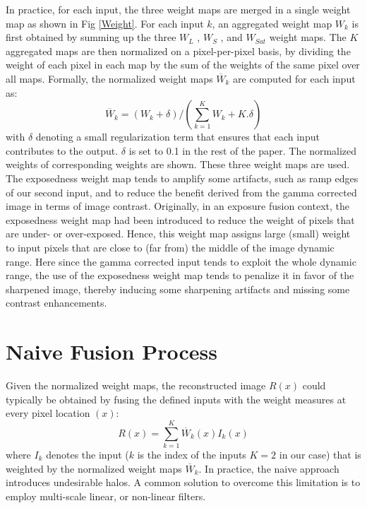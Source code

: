 \documentclass[hidelinks, 12pt]{report}
\begin{document}
In practice, for each input, the three weight maps are merged in a single weight map as shown in Fig \ref{Weight}. For each input $k$, an aggregated weight map $W_k$ is first obtained by summing up the three $W_L$ , $W_S$ , and $W_{Sat}$ weight maps. The $K$ aggregated maps are then normalized on a pixel-per-pixel basis, by dividing the weight of each pixel in each map by the sum of the weights of the same pixel over all maps. Formally, the
normalized weight maps $\overline{W}_k$ are computed for each input as:
\begin{equation}
\overline{W}_{k}=(W_k+\delta)/(\sum_{k=1}^{K}W_k + K.\delta)
\end{equation}
with $\delta$ denoting a small regularization term that ensures that each input contributes to the output. $\delta$ is set to 0.1 in the rest of the paper. The normalized weights of corresponding weights are shown. These three weight maps are used. The exposedness weight map tends to amplify some artifacts, such as ramp edges of our second input, and to reduce the benefit derived from the gamma corrected image in terms of image contrast. Originally, in an exposure fusion context, the exposedness weight map had been introduced to reduce the weight of pixels that are under- or over-exposed. Hence, this weight map assigns large (small) weight to input pixels that are close to (far from) the middle of the image dynamic range. Here since the gamma corrected input tends to exploit the whole dynamic range, the use of the exposedness weight map tends to penalize it in favor of the sharpened image, thereby inducing some sharpening artifacts and missing some contrast enhancements.

\section{Naive Fusion Process}
Given the normalized weight maps, the reconstructed image $R(x)$ could typically be obtained by fusing the defined inputs with the weight measures at every pixel location $(x)$:
\begin{equation}
R(x)=\sum_{k=1}^{K}\overline{W}_k(x)I_k(x)
\end{equation}
where $I_k$ denotes the input ($k$ is the index of the inputs $K=2$ in our case) that is weighted by the normalized weight maps $\overline{W}_k$. In practice, the naive approach introduces undesirable halos. A common solution to overcome this limitation is to employ multi-scale linear, or non-linear filters.
\end{document}
